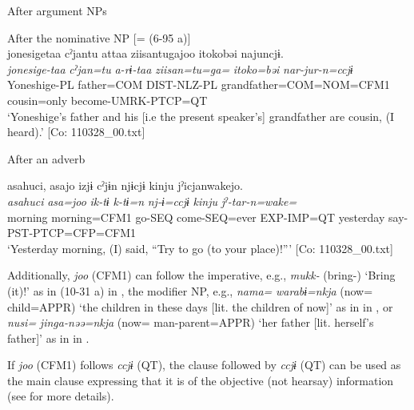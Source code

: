 \begin{xlist}
  \exi{} After argument NPs

  \ex  After the nominative NP [= (6-95 a)]\\
      \glll    jonesigetaa  cˀjantu  attaa  ziisantugajoo   {\textbar}itoko{\textbar}bəi  najuncjɨ.\\                                                                                             
      \textit{jonesige-taa}  \textit{cˀjan=tu}  \textit{a-rɨ-taa}  \textit{ziisan=tu=ga=} \textit{itoko=bəi}  \textit{nar-jur-n=ccjɨ}\\                                                                                             
      Yoneshige-PL  father=COM  DIST-NLZ-PL  grandfather=COM=NOM=CFM1   cousin=only  become-UMRK-PTCP=QT\\
      \glt ‘Yoneshige’s father and his [i.e the present speaker’s] grandfather are cousin, (I heard).’ [Co: 110328\_00.txt]

  \exi{} After an adverb

  \ex  %
      \glll    asahuci,  asajo  izjɨ  cˀjɨn  njɨcjɨ  kinju  jˀicjanwakejo.\\                                                                                              
      \textit{asahuci}  \textit{asa=joo}  \textit{ik-tɨ}  \textit{k-tɨ=n}  \textit{nj-ɨ=ccjɨ} \textit{kinju}  \textit{jˀ-tar-n=wake=}\\                                                                                              
      morning  morning=CFM1  go-SEQ  come-SEQ=ever  EXP-IMP=QT   yesterday  say-PST-PTCP=CFP=CFM1\\
      \glt ‘Yesterday morning, (I) said, “Try to go (to your place)!”’      [Co: 110328\_00.txt]
    \end{xlist}
\z

Additionally, \textit{joo} (CFM1) can follow the imperative, e.g., \textit{mukk-} (bring-) ‘Bring (it)!’ as in (10-31 a) in , the modifier NP, e.g., \textit{nama=} \textit{warabɨ=nkja} (now= child=APPR) ‘the children in these days [lit. the children of now]’ as in  in , or \textit{nusi=} \textit{jinga-nəə=nkja} (now= man-parent=APPR) ‘her father [lit. herself’s father]’ as in  in .

  If \textit{joo} (CFM1) follows \textit{ccjɨ} (QT), the clause followed by \textit{ccjɨ} (QT) can be used as the main clause expressing that it is of the objective (not hearsay) information (see  for more details).

